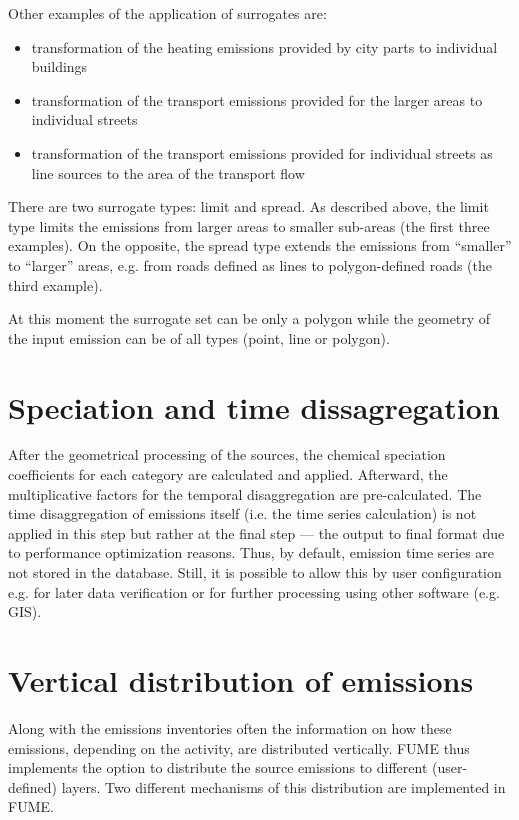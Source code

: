 \documentclass[a4paper,11pt]{article}
\begin{document}
Other examples of the application of surrogates are:
\begin{itemize}
    \item transformation of the heating emissions provided by city parts to individual buildings
    \item transformation of the transport emissions provided for the larger areas to individual streets
    \item transformation of the transport emissions provided for individual streets as line sources to the area of the transport flow
\end{itemize}

There are two surrogate types: limit and spread. As described above, the limit type limits the emissions from larger areas to smaller sub-areas (the first three examples). On the opposite, the spread type extends the emissions from ``smaller'' to ``larger'' areas, e.g. from roads defined as lines to polygon-defined roads (the third example).

At this moment the surrogate set can be only a polygon while the geometry of the input emission can be of all types (point, line or polygon).

\section{Speciation and time dissagregation}
After the geometrical processing of the sources, the chemical speciation coefficients for each category are calculated and applied. Afterward, the multiplicative factors for the temporal disaggregation are pre-calculated. The time disaggregation of emissions itself (i.e. the time series calculation) is not applied in this step but rather at the final step --- the output to final format due to performance optimization reasons. Thus, by default, emission time series are not stored in the database. Still, it is possible to allow this by user configuration e.g. for later data verification or for further processing using other software (e.g. GIS).

\section{Vertical distribution of emissions}\label{sec:vdist}

Along with the emissions inventories often the information on how these emissions, depending on the activity, are distributed vertically. FUME thus implements the option to distribute the source emissions to different (user-defined) layers. Two different mechanisms of this distribution are implemented in FUME.
\end{document}
